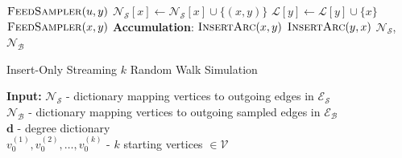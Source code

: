 \documentclass[10]{report}
\newcommand{\algoname}[1]{\textnormal{\textsc{#1}}}
\begin{document}
\begin{algorithm}[htbp]
\begin{flushleft}
\begin{algorithmic}[1]
					\State $\algoname{FeedSampler}(u,y)$
				\EndFor
			\EndIf
				\State $\mathcal{N}_\mathcal{S}[x] \gets \mathcal{N}_\mathcal{S}[x] \cup \{(x, y)\}$
				\State $\mathcal{L}[y] \gets \mathcal{L}[y] \cup \{x\}$
			\Else
				\State $\algoname{FeedSampler}(x,y)$
			\EndIf
		\EndFunction
	\Statex \textbf{Accumulation}:
			\State $\algoname{InsertArc}(x, y)$
			\State $\algoname{InsertArc}(y, x)$
		\EndFor
		\State \Return $\mathcal{N}_\mathcal{S}$, $\mathcal{N}_\mathcal{B}$
\end{algorithmic}
\end{flushleft}
\end{algorithm}

\begin{algorithm}[htbp] 
\caption{Insert-Only Streaming $k$ Random Walk Simulation}\label{alg:rw:serial:insert-only:simulation}
\begin{flushleft}
        \textbf{Input:} 		$\mathcal{N}_\mathcal{S}$ - dictionary mapping vertices to outgoing edges in $\mathcal{E}_\mathcal{S}$ \\
        	\hspace{3.15em}	$\mathcal{N}_\mathcal{B}$ - dictionary mapping vertices to outgoing sampled edges in $\mathcal{E}_\mathcal{B}$ \\
        	\hspace{3.15em}	$\mathbf{d}$ - degree dictionary \\
        	\hspace{3.15em}	$v_0^{(1)}, v_0^{(2)}, \dots, v_0^{(k)}$ - $k$ starting vertices $\in \mathcal{V}$ \\

\end{flushleft}
\end{algorithm}
\end{document}
